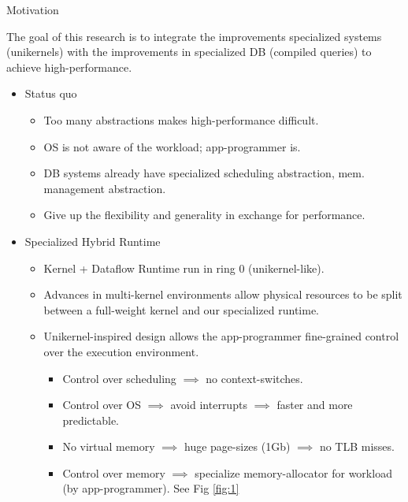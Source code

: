 \begin{block}{Motivation}

  The goal of this research is to integrate the improvements
  specialized systems (unikernels) with the improvements in
  specialized DB (compiled queries) to achieve high-performance.

  \begin{itemize}
  \item Status quo
    \begin{itemize}
    \item Too many abstractions makes high-performance difficult.
    \item OS is not aware of the workload; app-programmer is.
    \item DB systems already have specialized scheduling abstraction, mem. management abstraction.
    \item \alert{Give up the flexibility and generality in exchange for performance.}
    \end{itemize}

  \item Specialized Hybrid Runtime
    \begin{itemize}
    \item Kernel + Dataflow Runtime run in ring 0 (unikernel-like).
    \item Advances in multi-kernel environments allow physical  resources to be split between a full-weight kernel and our specialized runtime.
    \item {Unikernel-inspired design allows the app-programmer fine-grained control over the execution environment.}
      \begin{itemize}
      \item Control over scheduling $\implies$ no context-switches.
      \item Control over OS $\implies$ avoid interrupts $\implies$ faster and more predictable.
      \item No virtual memory $\implies$ huge page-sizes (1Gb) $\implies$ no TLB misses.
      \item Control over memory $\implies$ specialize memory-allocator for workload (by app-programmer). See Fig \ref{fig:1}
      \end{itemize}
    \end{itemize}


\end{itemize}
\end{block}
